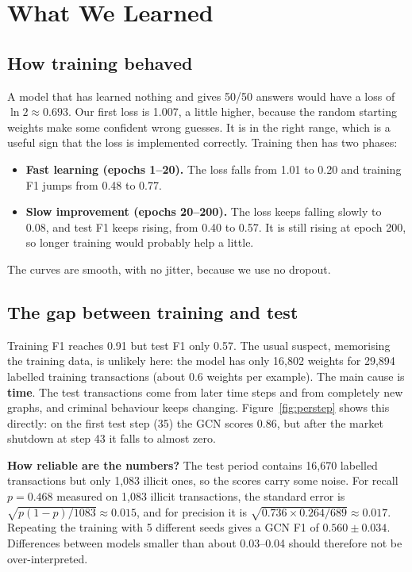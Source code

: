\documentclass[11pt,a4paper]{article}
\begin{document}
\section{What We Learned}
\subsection{How training behaved}
\label{sec:trainbehaviour}
A model that has learned nothing and gives 50/50 answers would have a loss of $\ln 2 \approx 0.693$. Our first loss is 1.007,
a little higher, because the random starting weights make some confident wrong guesses. It is in the right range, which is
a useful sign that the loss is implemented correctly. Training then has two phases:
\begin{itemize}
  \item \textbf{Fast learning (epochs 1--20).} The loss falls from 1.01 to 0.20 and training F1 jumps from 0.48 to 0.77.
  \item \textbf{Slow improvement (epochs 20--200).} The loss keeps falling slowly to 0.08, and test F1 keeps rising,
        from 0.40 to 0.57. It is still rising at epoch 200, so longer training would probably help a little.
\end{itemize}
The curves are smooth, with no jitter, because we use no dropout.

\subsection{The gap between training and test}
\label{sec:general}
Training F1 reaches 0.91 but test F1 only 0.57. The usual suspect, memorising the training data, is unlikely here: the model
has only 16,802 weights for 29,894 labelled training transactions (about 0.6 weights per example). The main cause is
\textbf{time}. The test transactions come from later time steps and from completely new graphs, and criminal behaviour keeps
changing. Figure~\ref{fig:perstep} shows this directly: on the first test step (35) the GCN scores 0.86, but after the
market shutdown at step 43 it falls to almost zero.

\textbf{How reliable are the numbers?} The test period contains 16,670 labelled transactions but only 1,083 illicit ones,
so the scores carry some noise. For recall $p = 0.468$ measured on 1,083 illicit transactions, the standard error is
$\sqrt{p(1-p)/1083} \approx 0.015$, and for precision it is $\sqrt{0.736 \times 0.264 / 689} \approx 0.017$. Repeating the
training with 5 different seeds gives a GCN F1 of $0.560 \pm 0.034$. Differences between models smaller than about
0.03--0.04 should therefore not be over-interpreted.
\end{document}
